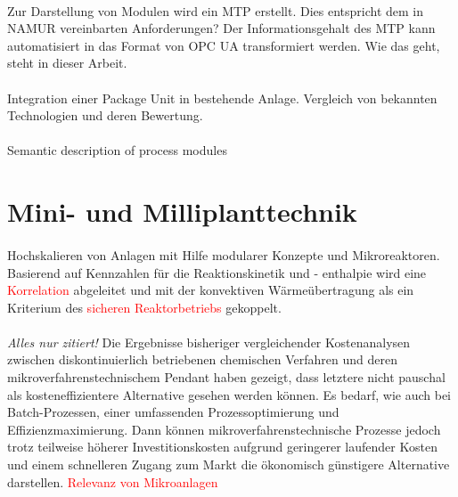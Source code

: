 \paragraph*{\cite{Wassilew_2016}}
Zur Darstellung von Modulen wird ein MTP erstellt. Dies entspricht dem in NAMUR vereinbarten Anforderungen? Der Informationsgehalt des MTP kann automatisiert in das Format von OPC UA transformiert werden. Wie das geht, steht in dieser Arbeit.

\paragraph*{\cite{Obst_2013a}}
Integration einer Package Unit in bestehende Anlage. Vergleich von bekannten Technologien und deren Bewertung.

\paragraph*{\cite{Obst_2015a}} Semantic description of process modules

\section{Mini- und Milliplanttechnik}
\paragraph*{\cite{Kockmann_2012}} Hochskalieren von Anlagen mit Hilfe modularer Konzepte und Mikroreaktoren. \hfill \newline
Basierend auf Kennzahlen für die Reaktionskinetik und - enthalpie wird eine \textcolor{red}{Korrelation} abgeleitet und mit der konvektiven Wärmeübertragung als ein Kriterium des \textcolor{red}{sicheren Reaktorbetriebs} gekoppelt.

\paragraph*{\cite{Sell_2013}}
\textit{Alles nur zitiert!} \hfill \newline
Die Ergebnisse bisheriger vergleichender Kostenanalysen zwischen diskontinuierlich betriebenen chemischen Verfahren und deren mikroverfahrenstechnischem Pendant haben gezeigt, dass letztere nicht pauschal als kosteneffizientere Alternative gesehen werden können. Es bedarf, wie auch bei Batch-Prozessen, einer umfassenden Prozessoptimierung und Effizienzmaximierung. Dann können mikroverfahrenstechnische Prozesse jedoch trotz teilweise höherer Investitionskosten aufgrund geringerer laufender Kosten und einem schnelleren Zugang zum Markt die ökonomisch günstigere Alternative darstellen. \textcolor{red}{Relevanz von Mikroanlagen}

